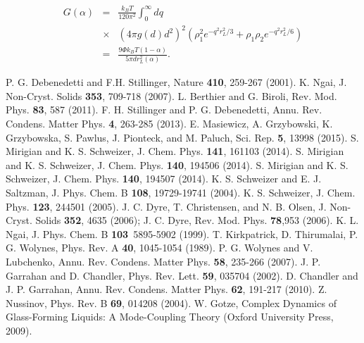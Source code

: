 \documentclass[twocolumn,showpacs,preprintnumbers,amsmath,amssymb,unsortedaddress,
]{revtex4-1}
\begin{document}
\begin{eqnarray}
G(\alpha) &=& \frac{k_BT}{120\pi^2}\int_{0}^{\infty}dq \nonumber\\
&\times& \left(4\pi g(d)d^2 \right)^2\left(\rho_1^2e^{-q^2r_{L}^2/3}+\rho_1\rho_2e^{-q^2r_{L}^2/6} \right) \nonumber\\
&=&\frac{9\Phi k_BT(1-\alpha)}{5\pi d r_L^2(\alpha)}.
\label{eq:appendix6}
\end{eqnarray}
\begin{thebibliography}{5}

 P. G. Debenedetti and F.H. Stillinger, Nature {\bf 410}, 259-267 (2001).
 K. Ngai, J. Non-Cryst. Solids {\bf 353}, 709-718 (2007).
 L. Berthier and G. Biroli, Rev. Mod. Phys. {\bf 83}, 587 (2011).
 F. H. Stillinger and P. G. Debenedetti, Annu. Rev. Condens. Matter Phys. {\bf 4}, 263-285 (2013).
 E. Masiewicz, A. Grzybowski, K. Grzybowska, S. Pawlus, J. Pionteck, and M. Paluch, Sci. Rep. {\bf 5}, 13998 (2015).
 S. Mirigian and K. S. Schweizer, J. Chem. Phys. {\bf 141}, 161103 (2014).
 S. Mirigian and K. S. Schweizer, J. Chem. Phys. {\bf 140}, 194506 (2014).
 S. Mirigian and K. S. Schweizer, J. Chem. Phys. {\bf 140}, 194507 (2014).
 K. S. Schweizer  and E. J. Saltzman, J. Phys. Chem. B {\bf 108}, 19729-19741 (2004).
 K. S. Schweizer, J. Chem. Phys. {\bf 123}, 244501 (2005).
 J. C. Dyre, T. Christensen, and N. B. Olsen, J. Non-Cryst. Solids {\bf 352}, 4635 (2006); J. C. Dyre, Rev. Mod. Phys. {\bf 78},953 (2006).
 K. L. Ngai, J. Phys. Chem. B {\bf 103}\, 5895-5902 (1999).
 T. Kirkpatrick, D. Thirumalai, P. G. Wolynes, Phys. Rev. A {\bf 40}, 1045-1054 (1989).
 P. G. Wolynes and V. Lubchenko, Annu. Rev. Condens. Matter Phys. {\bf 58}, 235-266 (2007).
 J. P. Garrahan and D. Chandler, Phys. Rev. Lett. {\bf 59}, 035704 (2002).
 D. Chandler and J. P. Garrahan, Annu. Rev. Condens. Matter Phys. {\bf 62}, 191-217 (2010).
 Z. Nussinov, Phys. Rev. B {\bf 69}, 014208 (2004).
 W. Gotze, Complex Dynamics of Glass-Forming Liquids: A Mode-Coupling Theory (Oxford
University Press, 2009).


\end{thebibliography}
\end{document}
